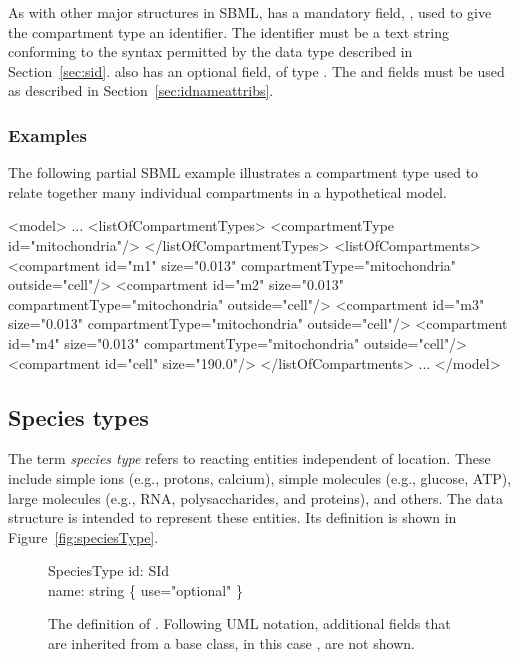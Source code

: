 As with other major structures in SBML, \CompartmentType has a
mandatory field, , used to give the compartment type an
identifier.  The identifier must be a text string conforming to
the syntax permitted by the  data type described in
Section~\ref{sec:sid}.  \CompartmentType also has an optional
 field, of type .  The 
and  fields must be used as described in
Section~\ref{sec:idnameattribs}.


\subsubsection{Examples}

The following partial SBML example illustrates a compartment type
used to relate together many individual compartments in a
hypothetical model.

\begin{example}
<model>
    ...
    <listOfCompartmentTypes>
        <compartmentType id="mitochondria"/>
    </listOfCompartmentTypes>
    <listOfCompartments>
        <compartment id="m1" size="0.013" compartmentType="mitochondria" outside="cell"/>
        <compartment id="m2" size="0.013" compartmentType="mitochondria" outside="cell"/>
        <compartment id="m3" size="0.013" compartmentType="mitochondria" outside="cell"/>
        <compartment id="m4" size="0.013" compartmentType="mitochondria" outside="cell"/>
        <compartment id="cell" size="190.0"/>
    </listOfCompartments>
    ...
</model>
\end{example}



\subsection{Species types}
\label{sec:speciesType}

The term \emph{species type} refers to reacting entities
independent of location.  These include simple ions (e.g.,
protons, calcium), simple molecules (e.g., glucose, ATP), large
molecules (e.g., RNA, polysaccharides, and proteins), and others.
The \SpeciesType data structure is intended to represent these
entities.  Its definition is shown in
Figure~\vref{fig:speciesType}.

\begin{figure}[htb]
  \centering
  \begin{classbox}{SpeciesType}
    id: SId                           \\
    name: string \{ use="optional" \} \\
  \end{classbox}
\caption{The definition of \SpeciesType.  Following UML notation,
    additional fields
    that are inherited from a base class, in this case \SBase, are not shown.}
  \label{fig:speciesType}
\end{figure}

